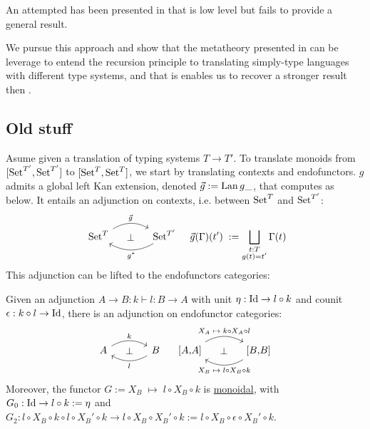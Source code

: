 An attempted has been presented in \cite{IntroductionIS24} that is low level
but fails to provide a general result.

We pursue this approach and show that the metatheory presented in
 can be leverage to entend the recursion principle to
translating simply-type languages with different type systems, and that is
enables us to recover a stronger result then \cite{ExtendedInitiality12}.


\subsection{Old stuff}
Asume given a translation of typing systems $T \to T'$.
To translate monoids from $[\operatorname{Set}^{T'},\operatorname{Set}^{T'}]$ to $[\operatorname{Set}^T,\operatorname{Set}^T]$,
we start by translating contexts and endofunctors.
$g$ admits a global left Kan extension, denoted
$\vec{g} := \operatorname{Lan}{g}{\_}$, that computes as below.
It entails an adjunction on contexts, i.e. between $\operatorname{Set}^T$ and $\operatorname{Set}^{T'}$:
%
\begin{align*}
  \begin{tikzcd}[ampersand replacement = \&, column sep=large]
      \Set^T
          \ar[r, bend left, "\vec{g}"]
          \ar[r, phantom, "\perp"]
        \& \Set^{T'} \ar[l, bend left, "g^*"]
  \end{tikzcd}
  &&
  \vec{g}(\Gamma)(t') \;:= \bigsqcup_{\substack{t : T \\ g(t) = t'}} \Gamma(t)
\end{align*}
%
This adjunction can be lifted to the endofunctors categories:

\begin{proposition}
  Given an adjunction $A \to B : k \vdash l : B \to A$ with unit $\eta : \operatorname{Id}
  \to l \circ k$ and counit $\epsilon : k \circ l \to \operatorname{Id}$, there is an
  adjunction on endofunctor categories:
  \begin{align*}
    \begin{tikzcd}[ampersand replacement = \&, column sep=large]
      A \ar[r, bend left, "k"]
                \ar[r, phantom, "\perp"]
        \& B \ar[l, bend left, "l"]
    \end{tikzcd}
    &&
    \begin{tikzcd}[ampersand replacement = \&, column sep=large]
        {[}A{,}A{]} \ar[r, bend left, "X_A \;\mapsto\; k \circ X_A \circ l"]
                  \ar[r, phantom, "\perp"]
          \& {[}B{,}B{]} \ar[l, bend left, "X_B \;\mapsto\; l \circ X_B \circ k"]
    \end{tikzcd}
  \end{align*}
  Moreover, the functor $G := X_B \;\mapsto\; l \circ X_B \circ k$ is
  \hyperref[def:monoidal-functor]{monoidal}, with $G_0 : \operatorname{Id} \to l \circ k
  := \eta$ and $G_2 : l \circ X_B \circ k \circ l \circ X_B' \circ k \to l
  \circ X_B \circ X_B' \circ k := l \circ X_B \circ \epsilon \circ X_B'\circ
  k$.
\end{proposition}

